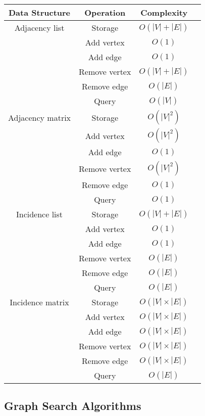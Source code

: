 \documentclass{article}
\begin{document}
\begin{table}[ht]
	\centering
	\scriptsize
	\begin{tabular}{cccc}
		\textbf{Data Structure} & \textbf{Operation} & \textbf{Complexity} \\
		\hline
		Adjacency list & Storage &  $O(|V|+|E|)$  \\
		& Add vertex & $O(1)$  \\
		& Add edge & $O(1)$  \\
		& Remove vertex & $O(|V|+|E|)$  \\
		& Remove edge & $O(|E|)$  \\
		& Query & $O(|V|)$  \\
		\hline
		Adjacency matrix & Storage & $O(|V|^2)$  \\
		& Add vertex & $O(|V|^2)$  \\
		& Add edge & $O(1)$  \\
		& Remove vertex & $O(|V|^2)$  \\
		& Remove edge & $O(1)$  \\
		& Query & $O(1)$  \\
		\hline
		Incidence list & Storage &  $O(|V|+|E|)$  \\
		& Add vertex & $O(1)$  \\
		& Add edge & $O(1)$  \\
		& Remove vertex & $O(|E|)$  \\
		& Remove edge & $O(|E|)$  \\
		& Query & $O(|E|)$  \\
		\hline
		Incidence matrix & Storage &  $O(|V|\times|E|)$  \\
		& Add vertex & $O(|V|\times|E|)$  \\
		& Add edge & $O(|V|\times|E|)$  \\
		& Remove vertex & $O(|V|\times|E|)$  \\
		& Remove edge & $O(|V|\times|E|)$  \\
		& Query & $O(|E|)$  \\
		\hline
	\end{tabular}
\end{table}


\newpage
\subsection*{Graph Search Algorithms}
\end{document}

